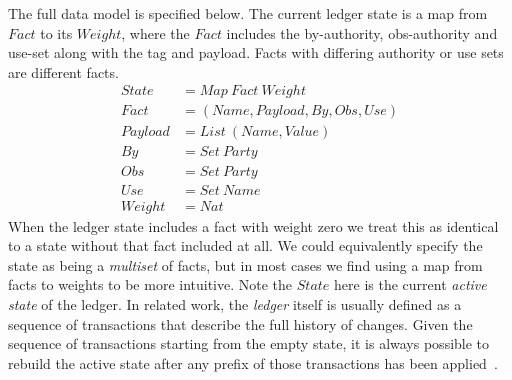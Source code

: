 The full data model is specified below. The current ledger state is a map from $Fact$ to its $Weight$, where the $Fact$ includes the by-authority, obs-authority and use-set along with the tag and payload. Facts with differing authority or use sets are different facts.
$$
\begin{array}{ll}
   State   & = Map~ Fact~ Weight
\\ Fact    & = (Name, Payload, By, Obs, Use)
\\ Payload & = List~ (Name, Value)
\\ By      & = Set~ Party
\\ Obs     & = Set~ Party
\\ Use     & = Set~ Name
\\ Weight  & = Nat
\end{array}
$$
When the ledger state includes a fact with weight zero we treat this as identical to a state without that fact included at all. We could equivalently specify the state as being a \emph{multiset} of facts, but in most cases we find using a map from facts to weights to be more intuitive. Note the $State$ here is the current \emph{active state} of the ledger. In related work, the \emph{ledger} itself is usually defined as a sequence of transactions that describe the full history of changes. Given the sequence of transactions starting from the empty state, it is always possible to rebuild the active state after any prefix of those transactions has been applied~\cite{Zahnentferner2018:Chimeric}.



